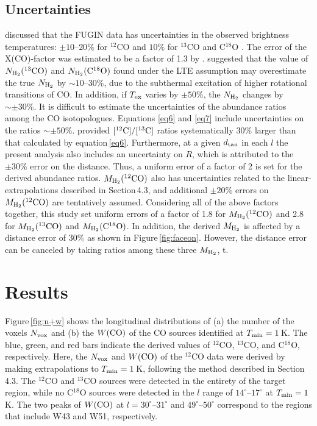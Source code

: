 \documentclass[proof]{pasj01}
\newcommand{\mtwo}{M_{\rm H_2}{\rm (^{12}CO)}}
\newcommand{\mthree}{M_{\rm H_2}{\rm (^{13}CO)}}
\newcommand{\meight}{M_{\rm H_2}{\rm (C^{18}O)}}
\begin{document}
\subsection{Uncertainties}
\citet{ume2017} discussed that the FUGIN data has uncertainties in the observed brightness temperatures: $\pm10$--$20\%$ for $^{12}$CO and $10\%$ for $^{13}$CO and C$^{18}$O \citep{ume2017}.
The error of the X(CO)-factor was estimated to be a factor of 1.3 by \citet{bol2013}. 
\citet{har2004} suggested that the value of $N_{\rm H_2}({\rm ^{13}CO})$ and $N_{\rm H_2}({\rm C^{18}O})$ found under the LTE assumption may overestimate the true $N_{\rm H_2}$ by $\sim10$--$30\%$, due to the subthermal excitation of higher rotational transitions of CO.
In addition, if $T_{\rm ex}$ varies by $\pm50\%$, the $N_{\rm H_2}$ changes by $\sim\pm30\%$.
It is difficult to estimate the uncertainties of the abundance ratios among the CO isotopologues.
Equations \ref{eq6} and \ref{eq7} include uncertainties on the ratios $\sim \pm50\%$.
\citet{mil2005} provided $[{\rm ^{12}C}]/[{\rm ^{13}C}]$ ratios systematically $30\%$ larger than that calculated by equation\,\ref{eq6}.
Furthermore, at a given $d_{\rm tan}$ in each $l$ the present analysis also includes an uncertainty on $R$, which is attributed to the $\pm30\%$ error on the distance.
Thus, a uniform error of a factor of 2 is set for the derived abundance ratios.
$\mtwo$ also has uncertainties related to the linear-extrapolations described in Section\,4.3, and additional $\pm20\%$ errors on $\mtwo$ are tentatively assumed.
Considering all of the above factors together, this study set uniform errors of a factor of 1.8 for $\mtwo$ and 2.8 for $\mthree$ and  $\meight$.
In addition, the derived $M_{\rm H_2}$ is affected by a distance error of $30\%$ as shown in Figure\,\ref{fig:faceon}.
However, the distance error can be canceled by taking ratios among these three $M_{\rm H_2}$, t.


\section{Results}
Figure\,\ref{fig:n+w} shows the longitudinal distributions of (a) the number of the voxels $N_{\rm vox}$ and (b) the $W({\rm CO})$ of the CO sources identified at $T_{\rm min} = 1$\,K.
The blue, green, and red bars indicate the derived values of $^{12}$CO, $^{13}$CO, and C$^{18}$O, respectively.
Here, the $N_{\rm vox}$ and $W({\rm CO})$ of the $^{12}$CO data were derived by making extrapolations to $T_{\rm min} = 1$\,K, following the method described in Section\,4.3.
The $^{12}$CO and $^{13}$CO sources were detected in the entirety of the target region, while no C$^{18}$O sources were detected in the $l$ range of $14^\circ$--$17^\circ$ at $T_{\rm min} = 1$\,K.
The two peaks of $W({\rm CO})$ at $l=30^\circ$--$31^\circ$ and $49^\circ$--$50^\circ$ correspond to the regions that include W43 and W51, respectively.
\end{document}
